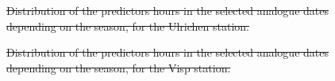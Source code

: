 \documentclass[hess, manuscript]{copernicus}
\providecommand{\DIFdel}[1]{{\protect\color{red}\sout{#1}}}                      %
\providecommand{\DIFdelFL}[1]{\DIFdel{#1}} %
\providecommand{\DIFdelbeginFL}{} %
\begin{document}
	\begin{figure}[htb]
		\DIFdelbeginFL %
{%
\DIFdelFL{Distribution of the predictors hours in the selected analogue dates depending on the season, for the Ulrichen station.}}

{%
\DIFdelFL{Distribution of the predictors hours in the selected analogue dates depending on the season, for the Visp station.}}


\end{figure}
\end{document}

